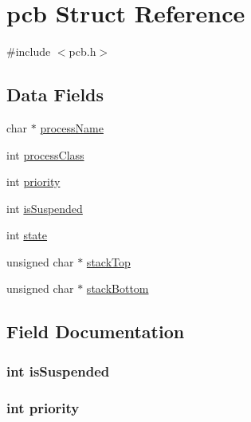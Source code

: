 \hypertarget{structpcb}{}\section{pcb Struct Reference}
\label{structpcb}


{\ttfamily \#include $<$pcb.\+h$>$}

\subsection*{Data Fields}
\begin{DoxyCompactItemize}
\item 
char $\ast$ \hyperlink{structpcb_a87501b25e6cc00b44c763d563ff56feb}{process\+Name}
\item 
int \hyperlink{structpcb_a616049b77d5f877f7cd6633f6c421d63}{process\+Class}
\item 
int \hyperlink{structpcb_acec9ce2df15222151ad66fcb1d74eb9f}{priority}
\item 
int \hyperlink{structpcb_a030f5087a1f437c25cf4a017e8409f49}{is\+Suspended}
\item 
int \hyperlink{structpcb_a89f234133d3efe315836311cbf21c64b}{state}
\item 
unsigned char $\ast$ \hyperlink{structpcb_a4570bd19470baff144028696fa01628c}{stack\+Top}
\item 
unsigned char $\ast$ \hyperlink{structpcb_a02a92960d9b4b330869e1a7bf123f771}{stack\+Bottom}
\end{DoxyCompactItemize}


\subsection{Field Documentation}
\subsubsection[{\texorpdfstring{is\+Suspended}{isSuspended}}]{\setlength{\rightskip}{0pt plus 5cm}int is\+Suspended}\hypertarget{structpcb_a030f5087a1f437c25cf4a017e8409f49}{}\label{structpcb_a030f5087a1f437c25cf4a017e8409f49}
\subsubsection[{\texorpdfstring{priority}{priority}}]{\setlength{\rightskip}{0pt plus 5cm}int priority}\hypertarget{structpcb_acec9ce2df15222151ad66fcb1d74eb9f}{}\label{structpcb_acec9ce2df15222151ad66fcb1d74eb9f}
